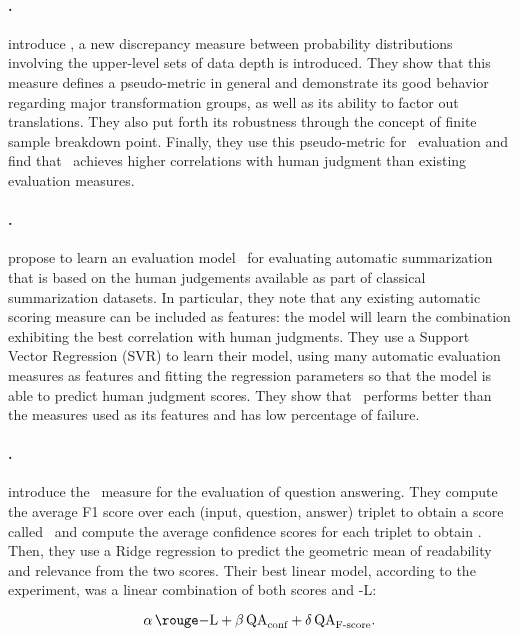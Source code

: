 \paragraph{\depth.}
\citet{staerman2021pseudo} introduce \depth, a new discrepancy measure between probability distributions involving the upper-level sets of data depth is introduced. They show that this measure defines a pseudo-metric in general and demonstrate its good behavior regarding major transformation groups, as well as its ability to factor out translations. They also put forth its robustness through the concept of finite sample
breakdown point. Finally, they use this pseudo-metric for \nlg\ evaluation and find that \depth\ achieves higher correlations with human judgment than existing evaluation measures.

\paragraph{\sthree.}
\citet{peyrard2017s3} propose to learn an evaluation model \sthree\ for evaluating automatic summarization that is based on the human judgements available as part of classical summarization datasets. In particular, they note that any existing automatic scoring measure can be included as features: the model will learn the combination exhibiting the best correlation with human judgments. They use a Support Vector Regression (SVR) to learn their model, using many automatic evaluation measures as features and fitting the regression parameters so that the model is able to predict human judgment scores. They show that \sthree\ performs better than the measures used as its features and has low percentage of failure.

\paragraph{\summa.}
\citet{scialom-etal-2019-answers} introduce the \summa\ measure for the evaluation of question answering. They compute the average F1 score over each (input, question, answer) triplet to obtain a score called \qascore\ and compute the average confidence scores for each triplet to obtain \qaconf. Then, they use a Ridge regression to predict the geometric mean of readability and relevance from the two scores. Their best linear model, according to the experiment, was a linear combination of both scores and \rouge-L:

\[ \alpha \, \rouge\mathrm{-L} + \beta \, \textrm{QA}_\textrm{conf} + \delta \, \textrm{QA}_\textrm{F-score} . \]

